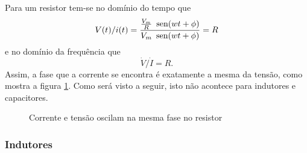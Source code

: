 Para um resistor tem-se no domínio do tempo que 
\[
V(t)/i(t)=\frac{\frac{V_{m}}{R}\mbox{\, sen}(wt+\phi)}{V_{m}\mbox{\, sen}(wt+\phi)}=R
\]
 e no domínio da frequência que 
\[
\dot{V}/\dot{I}=R.
\]
 Assim, a fase que a corrente se encontra é exatamente a mesma da
tensão, como mostra a figura \ref{fig:fase-ct-resistor}. Como será
visto a seguir, isto não acontece para indutores e capacitores.








\begin{figure}[H]
\begin{center}
\caption{\label{fig:fase-ct-resistor}Corrente e tensão oscilam na mesma fase no resistor}
\end{center}
\end{figure}


\subsubsection*{Indutores}

